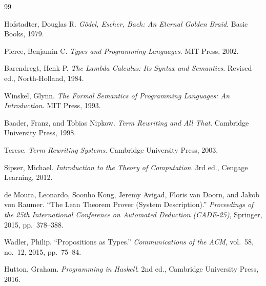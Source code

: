 \documentclass{article}
\theoremstyle{theorem}
\theoremstyle{definition}
\theoremstyle{remark}
\begin{document}
\begin{thebibliography}{99}

  Hofstadter, Douglas R. \emph{Gödel, Escher, Bach: An Eternal Golden Braid}. Basic Books, 1979.
  
  Pierce, Benjamin C. \emph{Types and Programming Languages}. MIT Press, 2002.
  
  Barendregt, Henk P. \emph{The Lambda Calculus: Its Syntax and Semantics}. Revised ed., North-Holland, 1984.
  
  Winskel, Glynn. \emph{The Formal Semantics of Programming Languages: An Introduction}. MIT Press, 1993.
  
  Baader, Franz, and Tobias Nipkow. \emph{Term Rewriting and All That}. Cambridge University Press, 1998.
  
  Terese. \emph{Term Rewriting Systems}. Cambridge University Press, 2003.
  
  Sipser, Michael. \emph{Introduction to the Theory of Computation}. 3rd ed., Cengage Learning, 2012.
  
  de Moura, Leonardo, Soonho Kong, Jeremy Avigad, Floris van Doorn, and Jakob von Raumer. ``The Lean Theorem Prover (System Description).'' \emph{Proceedings of the 25th International Conference on Automated Deduction (CADE-25)}, Springer, 2015, pp.\ 378--388.
  
  Wadler, Philip. ``Propositions as Types.'' \emph{Communications of the ACM}, vol.\ 58, no.\ 12, 2015, pp.\ 75--84.
  
  Hutton, Graham. \emph{Programming in Haskell}. 2nd ed., Cambridge University Press, 2016.

\end{thebibliography}
\end{document}
